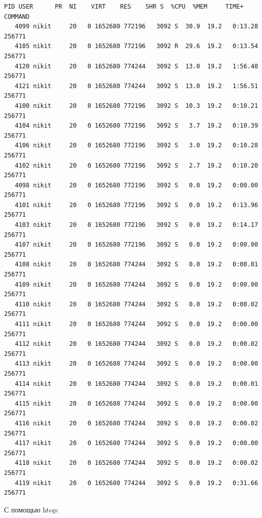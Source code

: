 \documentclass[11pt, a4paper]{article}
\begin{document}
\begin{Verbatim}[fontsize=\small]
    PID USER      PR  NI    VIRT    RES    SHR S  %CPU  %MEM     TIME+ COMMAND
   4099 nikit     20   0 1652680 772196   3092 S  30.9  19.2   0:13.28 256771
   4105 nikit     20   0 1652680 772196   3092 R  29.6  19.2   0:13.54 256771
   4120 nikit     20   0 1652680 774244   3092 S  13.0  19.2   1:56.40 256771
   4121 nikit     20   0 1652680 774244   3092 S  13.0  19.2   1:56.51 256771
   4100 nikit     20   0 1652680 772196   3092 S  10.3  19.2   0:10.21 256771
   4104 nikit     20   0 1652680 772196   3092 S   3.7  19.2   0:10.39 256771
   4106 nikit     20   0 1652680 772196   3092 S   3.0  19.2   0:10.28 256771
   4102 nikit     20   0 1652680 772196   3092 S   2.7  19.2   0:10.20 256771
   4098 nikit     20   0 1652680 772196   3092 S   0.0  19.2   0:00.00 256771
   4101 nikit     20   0 1652680 772196   3092 S   0.0  19.2   0:13.96 256771
   4103 nikit     20   0 1652680 772196   3092 S   0.0  19.2   0:14.17 256771
   4107 nikit     20   0 1652680 772196   3092 S   0.0  19.2   0:00.00 256771
   4108 nikit     20   0 1652680 774244   3092 S   0.0  19.2   0:00.01 256771
   4109 nikit     20   0 1652680 774244   3092 S   0.0  19.2   0:00.00 256771
   4110 nikit     20   0 1652680 774244   3092 S   0.0  19.2   0:00.02 256771
   4111 nikit     20   0 1652680 774244   3092 S   0.0  19.2   0:00.00 256771
   4112 nikit     20   0 1652680 774244   3092 S   0.0  19.2   0:00.02 256771
   4113 nikit     20   0 1652680 774244   3092 S   0.0  19.2   0:00.00 256771
   4114 nikit     20   0 1652680 774244   3092 S   0.0  19.2   0:00.01 256771
   4115 nikit     20   0 1652680 774244   3092 S   0.0  19.2   0:00.00 256771
   4116 nikit     20   0 1652680 774244   3092 S   0.0  19.2   0:00.02 256771
   4117 nikit     20   0 1652680 774244   3092 S   0.0  19.2   0:00.00 256771
   4118 nikit     20   0 1652680 774244   3092 S   0.0  19.2   0:00.02 256771
   4119 nikit     20   0 1652680 774244   3092 S   0.0  19.2   0:31.66 256771
\end{Verbatim}

С помощью htop:
\end{document}
